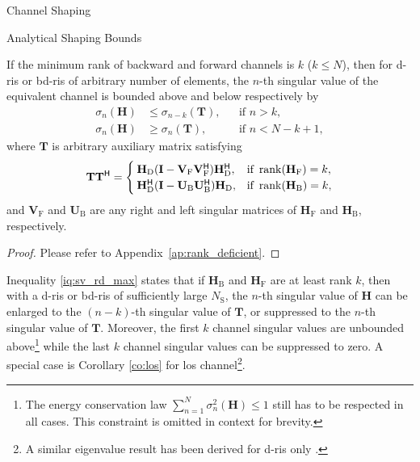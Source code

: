 \documentclass[journal]{IEEEtran}
\begin{document}
\begin{section}{Channel Shaping}
\begin{subsection}{Analytical Shaping Bounds}
		\begin{proposition}
			\label{pp:rd}
			If the minimum rank of backward and forward channels is $k$ ($k \le N$),
			then for \gls{d}-\gls{ris} or \gls{bd}-\gls{ris} of arbitrary number of elements, the $n$-th singular value of the equivalent channel is bounded above and below respectively by
			\begin{subequations}
				\label{iq:sv_rd}
				\begin{align}
					\sigma_n(\mathbf{H}) & \le \sigma_{n-k}(\mathbf{T}), &  & \text{if } n > k, \label{iq:sv_rd_max}          \\
					\sigma_n(\mathbf{H}) & \ge \sigma_n(\mathbf{T}),     &  & \text{if } n < N - k + 1, \label{iq:sv_rd_min}
				\end{align}
			\end{subequations}
			where $\mathbf{T}$ is arbitrary auxiliary matrix satisfying
			\begin{equation}
				\label{eq:auxiliary_rd}
				\mathbf{T} \mathbf{T}^\mathsf{H} =
				\begin{cases}
					\mathbf{H}_\mathrm{D} (\mathbf{I} - \mathbf{V}_\mathrm{F} \mathbf{V}_\mathrm{F}^\mathsf{H}) \mathbf{H}_\mathrm{D}^\mathsf{H}, & \text{if } \operatorname{rank}(\mathbf{H}_\mathrm{F}) = k, \\
					\mathbf{H}_\mathrm{D}^\mathsf{H} (\mathbf{I} - \mathbf{U}_\mathrm{B} \mathbf{U}_\mathrm{B}^\mathsf{H}) \mathbf{H}_\mathrm{D}, & \text{if } \operatorname{rank}(\mathbf{H}_\mathrm{B}) = k,
				\end{cases}
			\end{equation}
			and $\mathbf{V}_\mathrm{F}$ and $\mathbf{U}_\mathrm{B}$ are any right and left singular matrices of $\mathbf{H}_\mathrm{F}$ and $\mathbf{H}_\mathrm{B}$, respectively.
		\end{proposition}
		\begin{proof}
			Please refer to Appendix~\ref{ap:rank_deficient}.
		\end{proof}

		Inequality \eqref{iq:sv_rd_max} states that
		if $\mathbf{H}_\mathrm{B}$ and $\mathbf{H}_\mathrm{F}$ are at least rank $k$, then
		with a \gls{d}-\gls{ris} or \gls{bd}-\gls{ris} of sufficiently large $N_\mathrm{S}$,
		the $n$-th singular value of $\mathbf{H}$ can be enlarged to the $(n-k)$-th singular value of $\mathbf{T}$, or suppressed to the $n$-th singular value of $\mathbf{T}$.
		Moreover, the first $k$ channel singular values are unbounded above\footnote{The energy conservation law $\sum_{n=1}^N \sigma_n^2(\mathbf{H}) \le 1$ still has to be respected in all cases. This constraint is omitted in context for brevity.} while the last $k$ channel singular values can be suppressed to zero.
		A special case is Corollary \ref{co:los} for \gls{los} channel\footnote{A similar eigenvalue result has been derived for \gls{d}-\gls{ris} only \cite{Semmler2023}.}.



\end{subsection}
\end{section}
\end{document}
